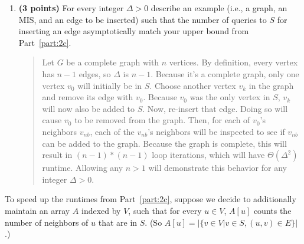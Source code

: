\documentclass[11pt]{article}
\begin{document}
\begin{enumerate}
\begin{enumerate}[resume]
    \item {\bf (3 points)} For every integer $\Delta>0$  describe an example (i.e., a graph, an MIS, and an edge to be inserted) such that the number of queries to $S$ for inserting an edge asymptotically match your upper bound from Part~\ref{part:2c}. 
      \begin{quote}
        \color{purple}
        Let $G$ be a complete graph with $n$ vertices. By definition, every vertex has $n - 1$ edges, so $\Delta$ is $n - 1$. Because it's a complete graph, only one vertex $v_0$ will initially be in $S$. Choose another vertex $v_k$ in the graph and remove its edge with $v_0$. Because $v_0$ was the only vertex in $S$, $v_k$ will now also be added to $S$. Now, re-insert that edge. Doing so will cause $v_0$ to be removed from the graph. Then, for each of $v_0$'s neighbors $v_{nb}$, each of the $v_{nb}$'s neighbors will be inspected to see if $v_{nb}$ can be added to the graph. Because the graph is complete, this will result in $(n - 1) * (n - 1)$ loop iterations, which will have $\Theta(\Delta^2)$ runtime. Allowing any $n > 1$ will demonstrate this behavior for any integer $\Delta > 0$. 
      \end{quote}
\end{enumerate}

To speed up the runtimes from Part~\ref{part:2c}, suppose we decide to additionally maintain 
an array $A$ indexed by $V$, such that for every $u\in V$, $A[u]$ counts the number of neighbors of $u$ that are in $S$. (So $A[u] = |\{v \in V | v \in S, (u,v) \in E\}|$.) 


\end{enumerate}
\end{document}
